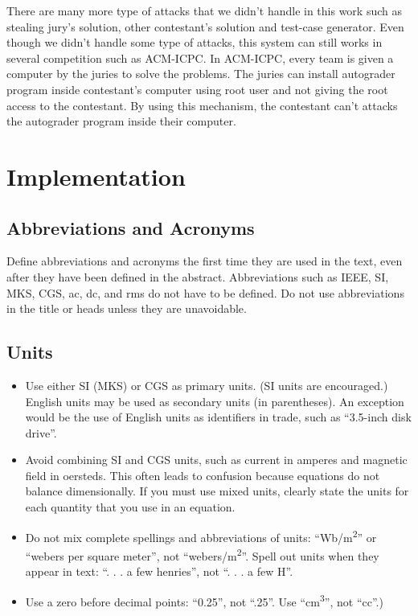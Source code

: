 \documentclass[conference]{IEEEtran}
\begin{document}
There are many more type of attacks that we didn't handle in this work such as stealing jury's solution, other contestant's solution and test-case generator. Even though we didn't handle some type of attacks, this system can still works in several competition such as ACM-ICPC. In ACM-ICPC, every team is given a computer by the juries to solve the problems. The juries can install autograder program inside contestant's computer using root user and not giving the root access to the contestant. By using this mechanism, the contestant can't attacks the autograder program inside their computer.

\section{Implementation}

\subsection{Abbreviations and Acronyms}\label{AA}
Define abbreviations and acronyms the first time they are used in the text, 
even after they have been defined in the abstract. Abbreviations such as 
IEEE, SI, MKS, CGS, ac, dc, and rms do not have to be defined. Do not use 
abbreviations in the title or heads unless they are unavoidable.

\subsection{Units}
\begin{itemize}
\item Use either SI (MKS) or CGS as primary units. (SI units are encouraged.) English units may be used as secondary units (in parentheses). An exception would be the use of English units as identifiers in trade, such as ``3.5-inch disk drive''.
\item Avoid combining SI and CGS units, such as current in amperes and magnetic field in oersteds. This often leads to confusion because equations do not balance dimensionally. If you must use mixed units, clearly state the units for each quantity that you use in an equation.
\item Do not mix complete spellings and abbreviations of units: ``Wb/m\textsuperscript{2}'' or ``webers per square meter'', not ``webers/m\textsuperscript{2}''. Spell out units when they appear in text: ``. . . a few henries'', not ``. . . a few H''.
\item Use a zero before decimal points: ``0.25'', not ``.25''. Use ``cm\textsuperscript{3}'', not ``cc''.)
\end{itemize}
\end{document}
